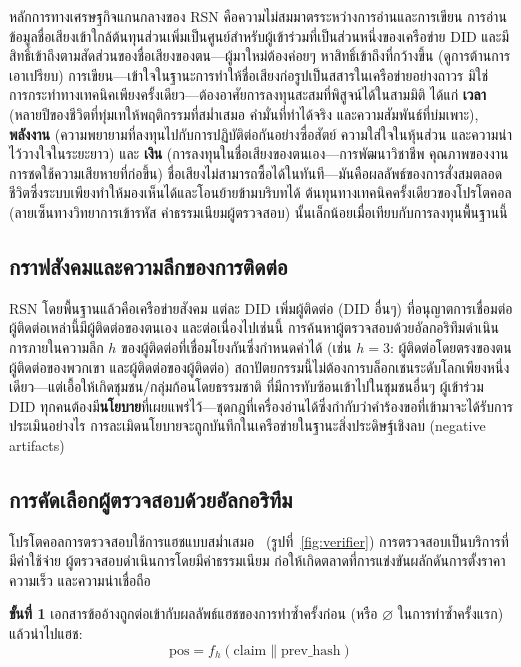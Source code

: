 \documentclass[11pt,a4paper,twocolumn]{article}
\begin{document}
หลักการทางเศรษฐกิจแกนกลางของ RSN คือความไม่สมมาตรระหว่างการอ่านและการเขียน การอ่านข้อมูลชื่อเสียงเข้าใกล้ต้นทุนส่วนเพิ่มเป็นศูนย์สำหรับผู้เข้าร่วมที่เป็นส่วนหนึ่งของเครือข่าย DID และมีสิทธิ์เข้าถึงตามสัดส่วนของชื่อเสียงของตน---ผู้มาใหม่ต้องค่อยๆ หาสิทธิ์เข้าถึงที่กว้างขึ้น (ดูการต้านการเอาเปรียบ) การเขียน---เข้าใจในฐานะการทำให้ชื่อเสียงก่อรูปเป็นสสารในเครือข่ายอย่างถาวร มิใช่การกระทำทางเทคนิคเพียงครั้งเดียว---ต้องอาศัยการลงทุนสะสมที่พิสูจน์ได้ในสามมิติ ได้แก่ \textbf{เวลา} (หลายปีของชีวิตที่ทุ่มเทให้พฤติกรรมที่สม่ำเสมอ คำมั่นที่ทำได้จริง และความสัมพันธ์ที่บ่มเพาะ), \textbf{พลังงาน} (ความพยายามที่ลงทุนไปกับการปฏิบัติต่อกันอย่างซื่อสัตย์ ความใส่ใจในหุ้นส่วน และความน่าไว้วางใจในระยะยาว) และ \textbf{เงิน} (การลงทุนในชื่อเสียงของตนเอง---การพัฒนาวิชาชีพ คุณภาพของงาน การชดใช้ความเสียหายที่ก่อขึ้น) ชื่อเสียงไม่สามารถซื้อได้ในทันที---มันคือผลลัพธ์ของการสั่งสมตลอดชีวิตซึ่งระบบเพียงทำให้มองเห็นได้และโอนย้ายข้ามบริบทได้ ต้นทุนทางเทคนิคครั้งเดียวของโปรโตคอล (ลายเซ็นทางวิทยาการเข้ารหัส ค่าธรรมเนียมผู้ตรวจสอบ) นั้นเล็กน้อยเมื่อเทียบกับการลงทุนพื้นฐานนี้

\subsection{กราฟสังคมและความลึกของการติดต่อ}

RSN โดยพื้นฐานแล้วคือเครือข่ายสังคม แต่ละ DID เพิ่มผู้ติดต่อ (DID อื่นๆ) ที่อนุญาตการเชื่อมต่อ ผู้ติดต่อเหล่านี้มีผู้ติดต่อของตนเอง และต่อเนื่องไปเช่นนี้ การค้นหาผู้ตรวจสอบด้วยอัลกอริทึมดำเนินการภายในความลึก $h$ ของผู้ติดต่อที่เชื่อมโยงกันซึ่งกำหนดค่าได้ (เช่น $h=3$: ผู้ติดต่อโดยตรงของตน ผู้ติดต่อของพวกเขา และผู้ติดต่อของผู้ติดต่อ) สถาปัตยกรรมนี้ไม่ต้องการบล็อกเชนระดับโลกเพียงหนึ่งเดียว---แต่เอื้อให้เกิดชุมชน/กลุ่มก้อนโดยธรรมชาติ ที่มีการทับซ้อนเข้าไปในชุมชนอื่นๆ ผู้เข้าร่วม DID ทุกคนต้องมี\textbf{นโยบาย}ที่เผยแพร่ไว้---ชุดกฎที่เครื่องอ่านได้ซึ่งกำกับว่าคำร้องขอที่เข้ามาจะได้รับการประเมินอย่างไร การละเมิดนโยบายจะถูกบันทึกในเครือข่ายในฐานะสิ่งประดิษฐ์เชิงลบ (negative artifacts)

\subsection{การคัดเลือกผู้ตรวจสอบด้วยอัลกอริทึม}

โปรโตคอลการตรวจสอบใช้การแฮชแบบสม่ำเสมอ~\cite{karger1997} (รูปที่~\ref{fig:verifier}) การตรวจสอบเป็นบริการที่มีค่าใช้จ่าย ผู้ตรวจสอบดำเนินการโดยมีค่าธรรมเนียม ก่อให้เกิดตลาดที่การแข่งขันผลักดันการตั้งราคา ความเร็ว และความน่าเชื่อถือ

\textbf{ขั้นที่ 1} เอกสารข้ออ้างถูกต่อเข้ากับผลลัพธ์แฮชของการทำซ้ำครั้งก่อน (หรือ $\varnothing$ ในการทำซ้ำครั้งแรก) แล้วนำไปแฮช:
\begin{equation}
\text{pos} = f_h(\text{claim} \| \text{prev\_hash})
\label{eq:hash}
\end{equation}
\end{document}
